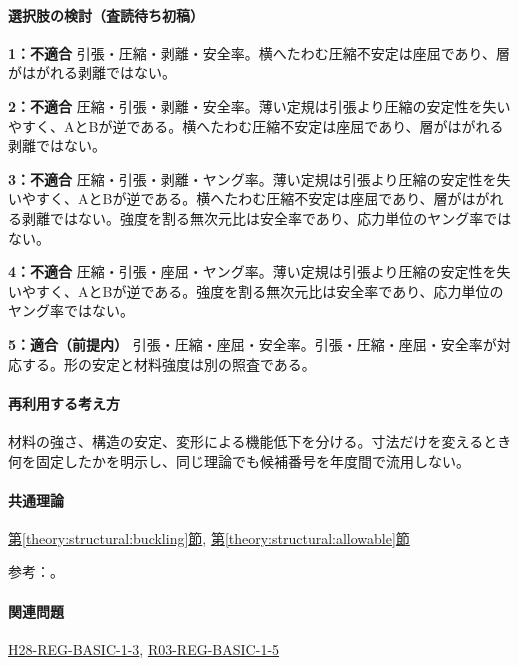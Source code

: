 \paragraph{選択肢の検討（査読待ち初稿）}\mbox{}\par

\noindent\textbf{1：不適合} 引張・圧縮・剥離・安全率。横へたわむ圧縮不安定は座屈であり、層がはがれる剥離ではない。\par

\noindent\textbf{2：不適合} 圧縮・引張・剥離・安全率。薄い定規は引張より圧縮の安定性を失いやすく、AとBが逆である。横へたわむ圧縮不安定は座屈であり、層がはがれる剥離ではない。\par

\noindent\textbf{3：不適合} 圧縮・引張・剥離・ヤング率。薄い定規は引張より圧縮の安定性を失いやすく、AとBが逆である。横へたわむ圧縮不安定は座屈であり、層がはがれる剥離ではない。強度を割る無次元比は安全率であり、応力単位のヤング率ではない。\par

\noindent\textbf{4：不適合} 圧縮・引張・座屈・ヤング率。薄い定規は引張より圧縮の安定性を失いやすく、AとBが逆である。強度を割る無次元比は安全率であり、応力単位のヤング率ではない。\par

\noindent\textbf{5：適合（前提内）} 引張・圧縮・座屈・安全率。引張・圧縮・座屈・安全率が対応する。形の安定と材料強度は別の照査である。\par

\paragraph{再利用する考え方} 材料の強さ、構造の安定、変形による機能低下を分ける。寸法だけを変えるとき何を固定したかを明示し、同じ理論でも候補番号を年度間で流用しない。

\paragraph{共通理論} \hyperref[theory:structural:buckling]{第\ref*{theory:structural:buckling}節}, \hyperref[theory:structural:allowable]{第\ref*{theory:structural:allowable}節}

\par 参考：\cite{struct_mit_beam,struct_mit_buckling,struct_mlit_limit}。

\paragraph{関連問題} \hyperref[q:h28-reg-basic-1-3]{H28-REG-BASIC-1-3}, \hyperref[q:r03-reg-basic-1-5]{R03-REG-BASIC-1-5}

